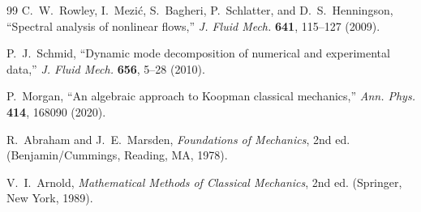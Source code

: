 \documentclass[11pt]{article}
\theoremstyle{remark}
\begin{document}
\begin{thebibliography}{99}
 C.~W.~Rowley, I.~Mezi\'c, S.~Bagheri, P.~Schlatter, and D.~S.~Henningson, ``Spectral analysis of nonlinear flows,'' \emph{J. Fluid Mech.} \textbf{641}, 115--127 (2009).

 P.~J.~Schmid, ``Dynamic mode decomposition of numerical and experimental data,'' \emph{J. Fluid Mech.} \textbf{656}, 5--28 (2010).

 P.~Morgan, ``An algebraic approach to Koopman classical mechanics,'' \emph{Ann. Phys.} \textbf{414}, 168090 (2020).

 R.~Abraham and J.~E.~Marsden, \emph{Foundations of Mechanics}, 2nd ed. (Benjamin/Cummings, Reading, MA, 1978).

 V.~I.~Arnold, \emph{Mathematical Methods of Classical Mechanics}, 2nd ed. (Springer, New York, 1989).

\end{thebibliography}
\end{document}
